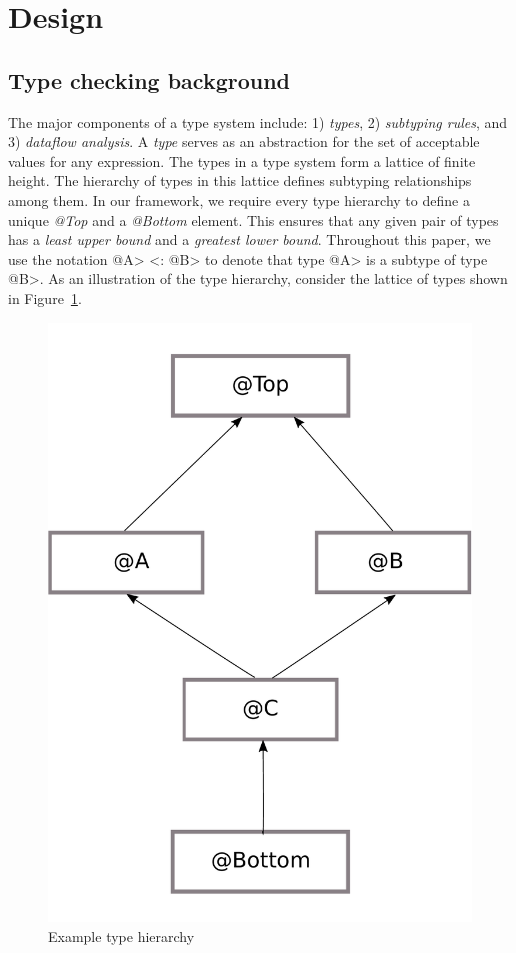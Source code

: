 \section{Design}
\subsection{Type checking background}
The major components of a type system include: 1) \textit{types}, 2) \textit{subtyping rules}, and 3) \textit{dataflow analysis}.
A \textit{type} serves as an abstraction for the set of acceptable values for any expression. The types in a type system form a lattice of finite height. 
The hierarchy of types in this lattice defines subtyping relationships among them.
In our framework, we require every type hierarchy to define a unique \textit{@Top} and a \textit{@Bottom} element. This ensures that
any given pair of types has a \textit{least upper bound} and a \textit{greatest lower bound}.
Throughout this paper, we use the notation \<@A> <: \<@B> to denote that type \<@A> is a subtype of type \<@B>.
As an illustration of the type hierarchy, consider the lattice of types shown in Figure~\ref{fig-example-lattice}.
\begin{figure}
	\begin{center}
		\includegraphics[scale=0.15]{lattice}
	\end{center}
	\caption{Example type hierarchy}
	\label{fig-example-lattice}
\end{figure}
